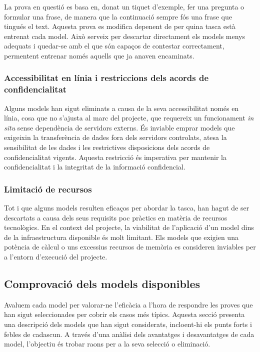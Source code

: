 La prova en questió es basa en, donat un tiquet d'exemple, fer una pregunta o formular una frase, de manera que la continuació sempre fós una frase que tingués el text. Aquesta prova es modifica depenent de per quina tasca està entrenat cada model. Això serveix per descartar directament els models menys adequats i quedar-se amb el que són capaços de contestar correctament, permentent entrenar només aquells que ja anaven encaminats.

\subsubsection{Accessibilitat en línia i restriccions dels acords de confidencialitat}
Alguns models han sigut eliminats a causa de la seva accessibilitat només en línia, cosa que no s'ajusta al marc del projecte, que requereix un funcionament \textit{in situ} sense dependència de servidors externs. És inviable emprar models que exigeixin la transferència de dades fora dels servidors controlats, atesa la sensibilitat de les dades i les restrictives disposicions dels acords de confidencialitat vigents. Aquesta restricció és imperativa per mantenir la confidencialitat i la integritat de la informació confidencial.

\subsubsection{Limitació de recursos}
Tot i que alguns models resulten eficaços per abordar la tasca, han hagut de ser descartats a causa dels seus requisits poc pràctics en matèria de recursos tecnològics. En el context del projecte, la viabilitat de l'aplicació d'un model dins de la infraestructura disponible és molt limitant. Els models que exigien una potència de càlcul o uns excessius recursos de memòria es consideren inviables per a l'entorn d'execució del projecte.


\subsection{Comprovació dels models disponibles}
Avaluem cada model per valorar-ne l'eficàcia a l'hora de respondre les proves que han sigut seleccionades per cobrir els casos més típics. Aquesta secció presenta una descripció dels models que han sigut considerats, incloent-hi els punts forts i febles de cadascun. A través d'una anàlisi dels avantatges i desavantatges de cada model, l'objectiu és trobar raons per a la seva selecció o eliminació.

